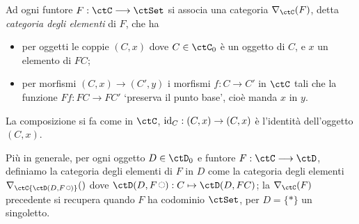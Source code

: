 \begin{definition}\label{elts_F}
	Ad ogni funtore \(F : \ctC\fun\ctSet\) si associa una categoria \(\Elts \ctC F\), detta \emph{categoria degli elementi} di \(F\), che ha
	\begin{itemize}
		\item per oggetti le coppie \((C,x)\) dove \(C\in\ctC_0\) è un oggetto di \(C\), e \(x\) un elemento di \(FC\);
		\item per morfismi \((C,x)\to (C',y)\) i morfismi \(f : C\to C'\) in \(\ctC\) tali che la funzione \(Ff : FC\to FC'\) `preserva il punto base', cioè manda \(x\) in \(y\).
	\end{itemize}
	La composizione si fa come in \(\ctC\), \(\Id[C] : (C,x)\to (C,x)\) è l'identità dell'oggetto \((C,x)\).
\end{definition}
Più in generale, per ogni oggetto \(D\in\ctD_0\) e funtore \(F : \ctC\fun\ctD\), definiamo la categoria degli elementi di \(F\) in \(D\) come la categoria degli elementi \(\Elts\ctC{\Hom\ctD(D,F\blank)}\) dove \(\Hom\ctD(D,F\blank) : C\mapsto\Hom\ctD(D,FC)\); la \(\Elts\ctC F\) precedente si recupera quando \(F\) ha codominio \(\ctSet\), per \(D=\{*\}\) un singoletto.

